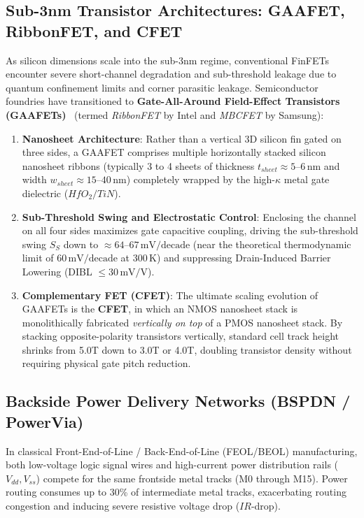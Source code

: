\subsection{Sub-3nm Transistor Architectures: GAAFET, RibbonFET, and CFET}
\label{subsec:ch1_gaafet}

As silicon dimensions scale into the sub-3nm regime, conventional FinFETs encounter severe short-channel degradation and sub-threshold leakage due to quantum confinement limits and corner parasitic leakage. Semiconductor foundries have transitioned to \textbf{Gate-All-Around Field-Effect Transistors (GAAFETs)}~\cite{IntelPowerVia2023} (termed \emph{RibbonFET} by Intel and \emph{MBCFET} by Samsung):
\begin{enumerate}
    \item \textbf{Nanosheet Architecture}: Rather than a vertical 3D silicon fin gated on three sides, a GAAFET comprises multiple horizontally stacked silicon nanosheet ribbons (typically 3 to 4 sheets of thickness $t_{sheet} \approx 5\text{--}6\,\mathrm{nm}$ and width $w_{sheet} \approx 15\text{--}40\,\mathrm{nm}$) completely wrapped by the high-$\kappa$ metal gate dielectric ($HfO_2/TiN$).
    \item \textbf{Sub-Threshold Swing and Electrostatic Control}: Enclosing the channel on all four sides maximizes gate capacitive coupling, driving the sub-threshold swing $S_S$ down to $\approx 64\text{--}67\,\mathrm{mV/decade}$ (near the theoretical thermodynamic limit of $60\,\mathrm{mV/decade}$ at $300\,\mathrm{K}$) and suppressing Drain-Induced Barrier Lowering (DIBL $\le 30\,\mathrm{mV/V}$).
    \item \textbf{Complementary FET (CFET)}: The ultimate scaling evolution of GAAFETs is the \textbf{CFET}, in which an NMOS nanosheet stack is monolithically fabricated \emph{vertically on top} of a PMOS nanosheet stack. By stacking opposite-polarity transistors vertically, standard cell track height shrinks from 5.0T down to 3.0T or 4.0T, doubling transistor density without requiring physical gate pitch reduction.
\end{enumerate}

\subsection{Backside Power Delivery Networks (BSPDN / PowerVia)}
\label{subsec:ch1_bspdn}

In classical Front-End-of-Line / Back-End-of-Line (FEOL/BEOL) manufacturing, both low-voltage logic signal wires and high-current power distribution rails ($V_{dd}, V_{ss}$) compete for the same frontside metal tracks (M0 through M15). Power routing consumes up to 30\% of intermediate metal tracks, exacerbating routing congestion and inducing severe resistive voltage drop ($IR$-drop).

